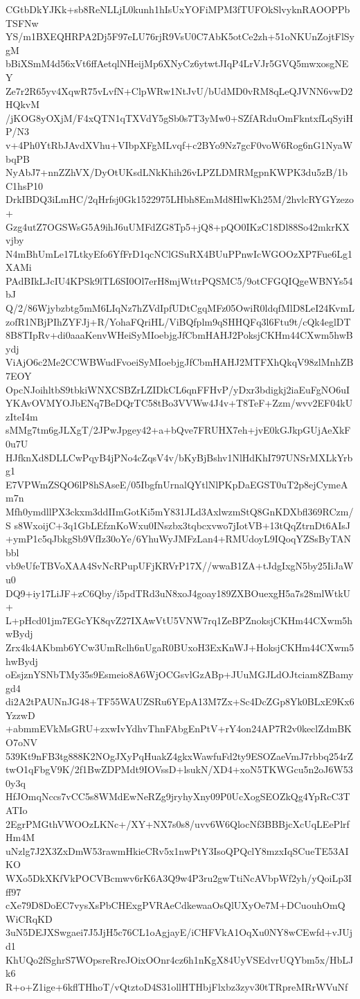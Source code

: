 CGtbDkYJKk+sb8ReNLLjL0kunh1hIsUxYOFiMPM3fTUFOkSlvyknRAOOPPbTSFNw
YS/m1BXEQHRPA2Dj5F97eLU76rjR9VsU0C7AbK5otCe2zh+51oNKUnZojtFlSygM
bBiXSmM4d56xVt6ffAetqlNHeijMp6XNyCz6ytwtJIqP4LrVJr5GVQ5mwxosgNEY
Ze7r2R65yv4XqwR75vLvfN+ClpWRw1NtJvU/bUdMD0vRM8qLeQJVNN6vwD2HQkvM
/jKOG8yOXjM/F4xQTN1qTXVdY5gSb0s7T3yMw0+SZfARduOmFkntxfLqSyiHP/N3
v+4Ph0YtRbJAvdXVhu+VIbpXFgMLvqf+c2BYo9Nz7gcF0voW6Rog6nG1NyaWbqPB
NyAbJ7+nnZZhVX/DyOtUKsdLNkKhih26vLPZLDMRMgpnKWPK3du5zB/1bC1hsP10
DrkIBDQ3iLmHC/2qHrfsj0Gk1522975LHbh8EmMd8HlwKh25M/2hvlcRYGYzezo+
Gzg4utZ7OGSWsG5A9ihJ6uUMFdZG8Tp5+jQ8+pQO0IKzC18Dl88So42mkrKXvjby
N4mBhUmLe17LtkyEfo6YfFrD1qcNClGSuRX4BUuPPnwIcWGOOzXP7Fue6Lg1XAMi
PAdBIkLJcIU4KPSk9lTL6SI0Ol7erH8mjWttrPQSMC5/9otCFGQIQgeWBNYs54bJ
Q/2/86Wjybzbtg5mM6LIqNz7hZVdIpfUDtCgqMFz05OwiR0ldqfMlD8LeI24KvmL
zofR1NBjPIhZYFJj+R/YohaFQriHL/ViBQfplm9qSHHQFq3l6Ftu9t/cQk4eglDT
8B8TIpRv+di0aaaKenvWHeiSyMIoebjgJfCbmHAHJ2PoksjCKHm44CXwm5hwBydj
ViAjO6c2Me2CCWBWudFvoeiSyMIoebjgJfCbmHAHJ2MTFXhQkqV98zlMnhZB7EOY
OpcNJoihltbS9tbkiWNXCSBZrLZIDkCL6qnFFHvP/yDxr3bdigkj2iaEuFgNO6uI
YKAvOVMYOJbENq7BeDQrTC58tBo3VVWw4J4v+T8TeF+Zzm/wvv2EF04kUzIteI4m
sMMg7tm6gJLXgT/2JPwJpgey42+a+bQve7FRUHX7eh+jvE0kGJkpGUjAeXkF0u7U
HJfknXd8DLLCwPqyB4jPNo4cZqsV4v/bKyBjBshv1NlHdKhI797UNSrMXLkYrbg1
E7VPWmZSQO6lP8hSAseE/05IbgfnUrnalQYtlNlPKpDaEGST0uT2p8ejCymeAm7n
Mfh0ymdllPX3ckxm3ddIImGotKi5mY831JLd3AxlwzmStQ8GnKDXbfl369RCzm/S
s8WxoijC+3q1GbLEfznKoWxu0INszbx3tqbcxvwo7jIotVB+13tQqZtrnDt6AIsJ
+ymP1c5qJbkgSb9VfIz30oYe/6YhuWyJMFzLan4+RMUdoyL9IQoqYZSsByTANbbl
vb9eUfeTBVoXAA4SvNcRPupUFjKRVrP17X//wwaB1ZA+tJdgIxgN5by25IiJaWu0
DQ9+iy17LiJF+zC6Qby/i5pdTRd3uN8xoJ4goay189ZXBOuexgH5a7s28mlWtkU+
L+pHcd01jm7EGcYK8qvZ27IXAwVtU5VNW7rq1ZeBPZnoksjCKHm44CXwm5hwBydj
Zrx4k4AKbmb6YCw3UmRclh6nUgaR0BUxoH3ExKnWJ+HoksjCKHm44CXwm5hwBydj
oEsjznYSNbTMy35s9Esmeio8A6WjOCGsvlGzABp+JUuMGJLdOJtciam8ZBamygd4
di2A2tPAUNnJG48+TF55WAUZSRu6YEpA13M7Zx+Sc4DcZGp8Yk0BLxE9Kx6YzzwD
+abmmEVkMsGRU+zxwIvYdhvThnFAbgEnPtV+rY4on24AP7R2v0keclZdmBKO7oNV
539Kt9nFB3tg888K2NOgJXyPqHuakZ4gkxWawfuFd2ty9ESOZaeVmJ7rbbq254rZ
twO1qFbgV9K/2f1BwZDPMdt9IOVssD+lsukN/XD4+xoN5TKWGcu5n2oJ6W530y3q
HfJOmqNccs7vCC5s8WMdEwNeRZg9jryhyXny09P0UcXogSEOZkQg4YpRcC3TATIo
2EgrPMGthVWOOzLKNc+/XY+NX7s0s8/uvv6W6QlocNf3BBBjcXcUqLEePlrfHm4M
uNzlg7J2X3ZxDmW53rawmHkieCRv5x1nwPtY3IsoQPQclY8mzxIqSCueTE53AIKO
WXo5DkXKfVkPOCVBcmwv6rK6A3Q9w4P3ru2gwTtiNcAVbpWf2yh/yQoiLp3Iff97
cXe79D8DoEC7vysXsPbCHExgPVRAeCdkewaaOsQlUXyOe7M+DCuouhOmQWiCRqKD
3uN5DEJXSwgaei7J5JjH5c76CL1oAgjayE/iCHFVkA1OqXu0NY8wCEwfd+vJUjd1
KhUQo2fSghrS7WOpsreRreJOixOOnr4cz6h1nKgX84UyVSEdvrUQYbm5x/HbLJk6
R+o+Z1ige+6kflTHhoT/vQtztoD4S31ollHTHbjFlxbz3zyv30tTRpreMRrWVuNf
